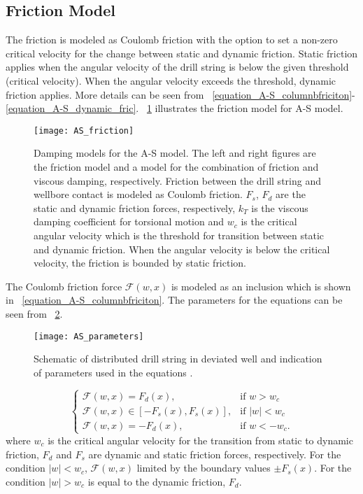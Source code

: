 \subsection{Friction Model}
\label{sec:asfrictionmodel}
The friction is modeled as Coulomb friction with the option to set a non-zero critical velocity for the change between static and dynamic friction.  Static friction applies when the angular velocity of the drill string is below the given threshold (critical velocity). When the angular velocity exceeds the threshold, dynamic friction applies. More details can be seen from \equationname~\ref{equation_A-S_columnbfriciton}-\ref{equation_A-S_dynamic_fric}. \figurename~\ref{figure_AS_friction} illustrates the friction model for A-S model.
\begin{figure}
  \centering
  \texttt{[image: AS\_friction]}
  \caption[Damping models for the A-S model]{Damping models for the A-S model. The left and right figures are the friction model and a model for the combination of friction and viscous damping, respectively. Friction between the drill string and wellbore contact is modeled as Coulomb friction. $F_{s}$, $F_{d}$ are the static and dynamic friction forces, respectively, $k_{T}$ is the viscous damping coefficient for torsional motion and $w_{c}$ is the critical angular velocity which is the threshold for transition between static and dynamic friction. When the angular velocity is below the critical velocity, the friction is bounded by static friction.}\label{figure_AS_friction}
\end{figure}

The Coulomb friction force $\mathcal{F}(w,x)$ is modeled as an inclusion which is shown in \equationname~\ref{equation_A-S_columnbfriciton}. The parameters for the equations can be seen from \figurename~\ref{figure_AS_equation_schematic}.
\begin{figure}
  \centering
  \texttt{[image: AS\_parameters]}
  \caption[Schematic of distributed drill string in deviated well]{Schematic of distributed drill string in deviated well and indication of parameters used in the equations \cite{ref:aarsnes2017a}.}\label{figure_AS_equation_schematic}
\end{figure}
\begin{equation}\label{equation_A-S_columnbfriciton}
  \begin{cases}
     \mathcal{F}(w,x) = F_{d}(x), & \mbox{if } w>w_c \\
     \mathcal{F}(w,x) \in [-F_{s}(x), F_{s}(x)], & \mbox{if } |w|<w_c \ \\
     \mathcal{F}(w,x) = -F_{d}(x), & \mbox{if } w < -w_c.
  \end{cases}
\end{equation}
where $w_c$ is the critical angular velocity for the transition from static to dynamic friction, $F_{d}$ and $F_{s}$ are dynamic and static friction forces, respectively. For the condition $|w|<w_c$, $\mathcal{F}(w,x)$ limited by the boundary values $\pm F_{s}(x)$.  For the condition $|w|>w_c$ is equal to the dynamic friction, $F_{d}$.

